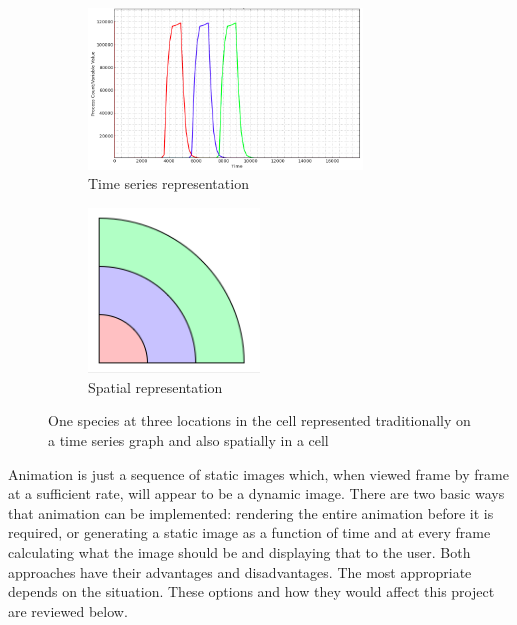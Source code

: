 \begin{figure}[h!]
    \centering
    \begin{subfigure}[b]{0.4\textwidth}
        \centering
        \includegraphics[width=0.8\textwidth]{images/asrc_graph_intro.png}
        \caption{Time series representation}
        \label{fig:asrc_graph_work}
    \end{subfigure}
    \begin{subfigure}[b]{0.4\textwidth}
        \centering
        \includegraphics[width=0.5\textwidth]{images/asrc_cell_intro.png}
        \caption{Spatial representation}
        \label{fig:asrc_cell_work}
    \end{subfigure}
    \caption{One species at three locations in the cell represented traditionally on a time series graph and also spatially in a cell}
    \label{fig:asrc_work}
\end{figure}

Animation is just a sequence of static images which, when viewed frame by frame at a sufficient rate, will appear to be a dynamic image.  There are two basic ways that animation can be implemented: rendering the entire animation before it is required, or generating a static image as a function of time and at every frame calculating what the image should be and displaying that to the user.  Both approaches have their advantages and disadvantages.  The most appropriate depends on the situation.  These options and how they would affect this project are reviewed below.

